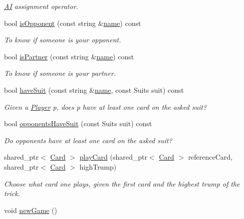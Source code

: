 \begin{DoxyCompactItemize}
\begin{DoxyCompactList}\small\item\em \hyperlink{classAI}{\-A\-I} assignment operator. \end{DoxyCompactList}\item 
bool \hyperlink{classAI_aec78eb8010bdcd99c899aaa7af79d9ea}{is\-Opponent} (const string \&\hyperlink{classPlayer_acf0355128a99ee20ad9931b760fb2de1}{name}) const 
\begin{DoxyCompactList}\small\item\em \-To know if someone is your opponent. \end{DoxyCompactList}\item 
bool \hyperlink{classAI_a0cd8c8e4a646c6c1ae51c7812eb1194e}{is\-Partner} (const string \&\hyperlink{classPlayer_acf0355128a99ee20ad9931b760fb2de1}{name}) const 
\begin{DoxyCompactList}\small\item\em \-To know if someone is your partner. \end{DoxyCompactList}\item 
bool \hyperlink{classAI_a01cd7c1760412dde024605226591328c}{have\-Suit} (const string \&\hyperlink{classPlayer_acf0355128a99ee20ad9931b760fb2de1}{name}, const \-Suits suit) const 
\begin{DoxyCompactList}\small\item\em \-Given a \hyperlink{classPlayer}{\-Player} p, does p have at least one card on the asked suit? \end{DoxyCompactList}\item 
bool \hyperlink{classAI_affad35d086fe81539b07a5626b19c1bb}{opponents\-Have\-Suit} (const \-Suits suit) const 
\begin{DoxyCompactList}\small\item\em \-Do opponents have at least one card on the asked suit? \end{DoxyCompactList}\item 
shared\-\_\-ptr$<$ \hyperlink{classCard}{\-Card} $>$ \hyperlink{classAI_a3f5b2888e03634db701c66f82a4f03a8}{play\-Card} (shared\-\_\-ptr$<$ \hyperlink{classCard}{\-Card} $>$ reference\-Card, shared\-\_\-ptr$<$ \hyperlink{classCard}{\-Card} $>$ high\-Trump)
\begin{DoxyCompactList}\small\item\em \-Choose what card one plays, given the first card and the highest trump of the trick. \end{DoxyCompactList}\item 
void \hyperlink{classAI_a6cda26d3bf7238b1a7ea3725bf4aabb7}{new\-Game} ()

\end{DoxyCompactItemize}

